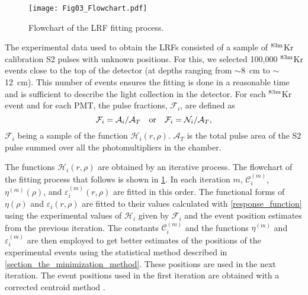 \documentclass[a4paper,11pt]{article}
\begin{document}
\begin{figure}
 \begin{center}
  \texttt{[image: Fig03\_Flowchart.pdf]}
  \caption{Flowchart of the LRF fitting process.}
  \label{Figure05_Flowchart}
 \end{center}
\end{figure}

The experimental data used to obtain the LRFs consisted of a sample of ${}^{{\rm 83m}}$Kr calibration S2 pulses with unknown positions. For this, we selected 100,000 ${}^{{\rm 83m}}$Kr events close to the top of the detector (at depths ranging from $\sim$8~cm to $\sim$12~cm). This  number of events ensures the fitting is done in a reasonable time and is sufficient to describe the light collection in the detector. For each ${}^{{\rm 83m}}$Kr event and for each PMT, the pulse fractions, $\mathcal{F}_i$, are defined as 
\begin{equation}
\mathcal{F}_i =\mathcal{A}_i {\Large /} \mathcal{A}_T  \quad \textrm{or} \quad \mathcal{F}_i =\mathcal{N}_i {\Large /} \mathcal{A}_T,
\label{the_second_eq}
\end{equation}
$\mathcal{F}_i$ being a sample of the function $\mathcal{H}_i\left(r,\rho\right)$. ${{\mathcal A}}_T$ is the total pulse area of the S2 pulse summed over all the photomultipliers in the chamber.


The functions $\mathcal{H}_i\left(r, \rho\right)$ are obtained by an iterative process. The flowchart of the fitting process that follows is shown in \cref{Figure05_Flowchart}. In each iteration $m$, $\mathcal{C}_i^{(m)}$, $\eta^{(m)}\left(\rho\right)$, and $\varepsilon_i^{(m)}\left(r, \rho\right)$ are fitted in this order. The functional forms of $\eta\left(\rho \right)$ and $\varepsilon_i\left(r, \rho\right)$ are fitted to their values calculated with \cref{response_function} using the experimental values of $\mathcal{H}_i$ given by $\mathcal{F}_i$ and the event position estimates from the previous iteration. The constants $\mathcal{C}_i^{(m)}$ and the functions $\eta^{(m)}$ and $\varepsilon_i^{(m)}$ are then employed to get better estimates of the positions of the experimental events using the statistical method described in \cref{section_the_minimization_method}. These positions are used in the next iteration. The event positions used in the first iteration are obtained with a corrected centroid method \cite{Solovov2011_PositionReconstruction}. 
\end{document}

